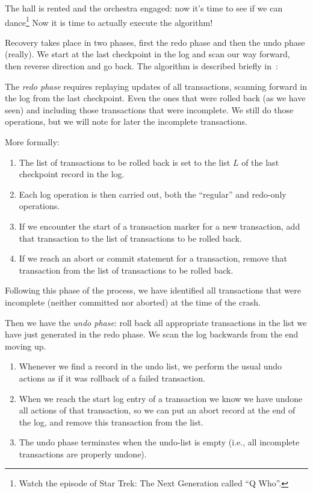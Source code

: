 \documentclass[a4paper]{report}
\begin{document}
The hall is rented and the orchestra engaged: now it's time to see if we can dance\footnote{Watch the episode of Star Trek: The Next Generation called ``Q Who''.} Now it is time to actually execute the algorithm! 

Recovery takes place in two phases, first the redo phase and then the undo phase (really). We start at the last checkpoint in the log and scan our way forward, then reverse direction and go back. The algorithm is described briefly in~\cite{dsc}:

The \textit{redo phase} requires replaying updates of all transactions, scanning forward in the log from the last checkpoint. Even the ones that were rolled back (as we have seen) and including those transactions that were incomplete. We still do those operations, but we will note for later the incomplete transactions. 

More formally:

\begin{enumerate}
	\item The list of transactions to be rolled back is set to the list $L$ of the last checkpoint record in the log.
	\item Each log operation is then carried out, both the ``regular'' and redo-only operations.
	\item If we encounter the start of a transaction marker for a new transaction, add that transaction to the list of transactions to be rolled back.
	\item If we reach an abort or commit statement for a transaction, remove that transaction from the list of transactions to be rolled back.
\end{enumerate}

Following this phase of the process, we have identified all transactions that were incomplete (neither committed nor aborted) at the time of the crash. 

Then we have the \textit{undo phase}: roll back all appropriate transactions in the list we have just generated in the redo phase. We scan the log backwards from the end moving up.

\begin{enumerate}
	\item Whenever we find a record in the undo list, we perform the usual undo actions as if it was rollback of a failed transaction.
	\item When we reach the start log entry of a transaction we know we have undone all actions of that transaction, so we can put an abort record at the end of the log, and remove this transaction from the list.
	\item The undo phase terminates when the undo-list is empty (i.e., all incomplete transactions are properly undone).
\end{enumerate}
\end{document}
